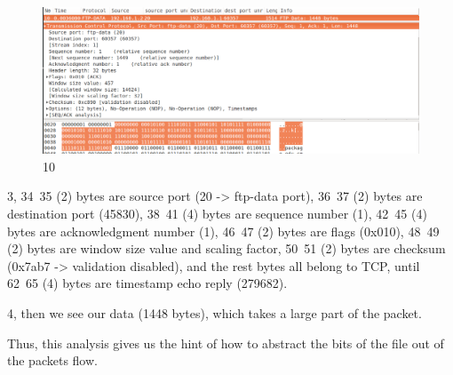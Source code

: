 \documentclass[a4paper,12pt]{article}
\begin{document}
\begin{figure}[ht!]
\centering
\includegraphics[width=120mm]{9.png}
\caption{10 \label{overflow}}
\end{figure}

3, 34~35 (2) bytes are source port (20 -> ftp-data port), 36~37 (2) bytes are destination port (45830), 38~41 (4) bytes are sequence number (1), 42~45 (4) bytes are acknowledgment number (1), 46~47 (2) bytes are flags (0x010), 
48~49 (2) bytes are window size value and scaling factor, 50~51 (2) bytes are checksum (0x7ab7 -> validation disabled), and the rest bytes all belong to TCP, until 62~65 (4) bytes are timestamp echo reply (279682).

4, then we see our data (1448 bytes), which takes a large part of the packet.

Thus, this analysis gives us the hint of how to abstract the bits of the file out of the packets flow.
\end{document}
